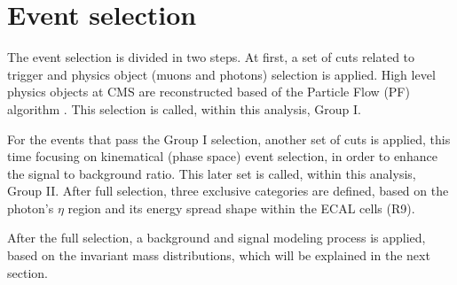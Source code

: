 \clearpage

\section{Event selection}
\label{sec:selection}

The event selection is divided in two steps. At first, a set of cuts related to trigger and physics object (muons and photons) selection is applied. High level physics objects at CMS are reconstructed based of the Particle Flow (PF) algorithm \cite{PF_paper_2016}. This selection is called, within this analysis, Group I. 

For the events that pass the Group I selection, another set of cuts is applied, this time focusing on kinematical (phase space) event selection, in order to enhance the signal to background ratio. This later set is called, within this analysis, Group II. After full selection, three exclusive categories are defined, based on the photon's $\eta$ region and its energy spread shape within the ECAL cells (R9).


After the full selection, a background and signal modeling process is applied, based on the invariant mass distributions, which will be explained in the next section.


